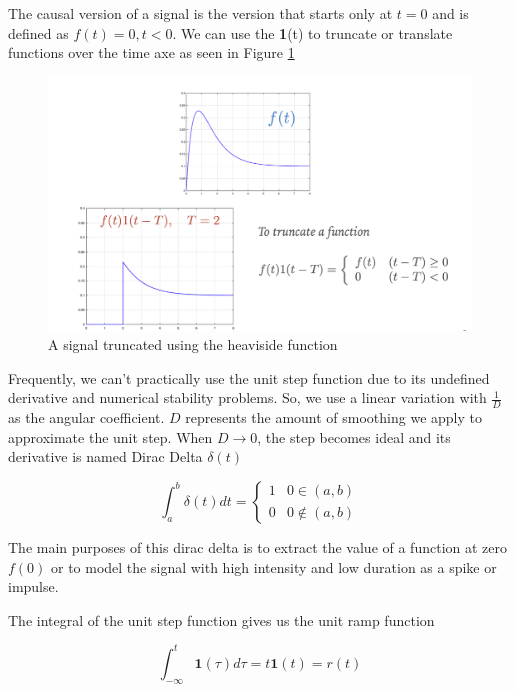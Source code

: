 \documentclass[11pt]{article}
\begin{document}
The causal version of a signal is the version that starts only at $t=0$ and is defined as $f(t) = 0, t <0$.
We can use the \textbf{1}(t) to truncate or translate functions over the time axe as seen in Figure \ref{fig:truncated_signal}

\begin{figure}[htbp]
  \centerline{\includegraphics[width=1\textwidth]{../../images/truncated_signal.png}}
  \caption{A signal truncated using the heaviside function}
  \label{fig:truncated_signal}
\end{figure}

Frequently, we can't practically use the unit step function due to its undefined derivative and numerical stability problems.
So, we use a linear variation with $\frac{1}{D}$ as the angular coefficient.
$D$ represents the amount of smoothing we apply to approximate the unit step.
When $D \longrightarrow 0$, the step becomes ideal and its derivative is named Dirac Delta $\delta(t)$

\begin{equation}
  \int_{a}^{b} \delta (t) dt =
  \begin{cases}
    1 & 0 \in (a,b) \\ 
    0 & 0 \notin (a,b)
  \end{cases}
\end{equation}

The main purposes of this dirac delta is to extract the value of a function at zero $f(0)$ or to model the signal with high intensity and low duration as a spike or impulse.

The integral of the unit step function gives us the unit ramp function

\begin{equation}
  \int_{-\infty}^{t} \textbf{1} (\tau) d \tau = t \textbf{1}(t) = r(t)
\end{equation}
\end{document}
